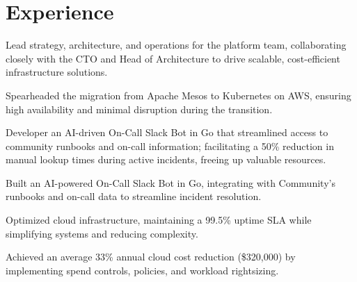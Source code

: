 \documentclass[]{resume}
\begin{document}
%
%

%
%

%
%

\begin{minipage}[t]{0.60\textwidth}

\section{Experience}
\vspace{\topsep} %
\begin{tightemize}
\item Lead strategy, architecture, and operations for the platform team, collaborating closely with the CTO and Head of Architecture to drive scalable, cost-efficient infrastructure solutions.
\item Spearheaded the migration from Apache Mesos to Kubernetes on AWS, ensuring high availability and minimal disruption during the transition.
\item Developer an AI-driven On-Call Slack Bot in Go that streamlined access to community runbooks and on-call information; facilitating a 50\% reduction in manual lookup times during active incidents, freeing up valuable resources.
\item Built an AI-powered On-Call Slack Bot in Go, integrating with Community’s runbooks and on-call data to streamline incident resolution.
\item Optimized cloud infrastructure, maintaining a 99.5\% uptime SLA while simplifying systems and reducing complexity.
\item Achieved an average 33\% annual cloud cost reduction (\$320,000) by implementing spend controls, policies, and workload rightsizing.
\end{tightemize}
\sectionsep


\end{minipage}
\end{document}
